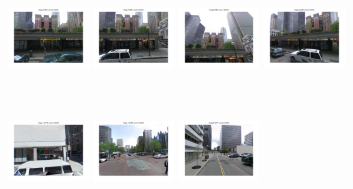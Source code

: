         \begin{minipage}{0.75\linewidth}
            \begin{minipage}{\linewidth} 
                \colorbox{myGreen}{\includegraphics[trim = 35mm 30mm 35mm 30mm, clip=true, height=16mm]{imgs/Pval/exImproved03/improvedPval01.jpg}}
                \colorbox{myGreen}{\includegraphics[trim = 35mm 30mm 35mm 30mm, clip=true, height=16mm]{imgs/Pval/exImproved03/improvedPval02.jpg}}
                \colorbox{myGreen}{\includegraphics[trim = 35mm 30mm 35mm 30mm, clip=true, height=16mm]{imgs/Pval/exImproved03/improvedPval03.jpg}}
                \colorbox{myGreen}{\includegraphics[trim = 35mm 30mm 35mm 30mm, clip=true, height=16mm]{imgs/Pval/exImproved03/improvedPval04.jpg}}
            \end{minipage}
            \\
            \begin{minipage}{\linewidth}
                \colorbox{myRed}{\includegraphics[trim = 35mm 30mm 35mm 30mm, clip=true, height=16mm]{imgs/Pval/exImproved03/improved01.jpg}}
                \colorbox{myRed}{\includegraphics[trim = 35mm 30mm 35mm 30mm, clip=true, height=16mm]{imgs/Pval/exImproved03/improved02.jpg}}
                \colorbox{myRed}{\includegraphics[trim = 35mm 30mm 35mm 30mm, clip=true, height=16mm]{imgs/Pval/exImproved03/improved03.jpg}}

\end{minipage}
\end{minipage}
